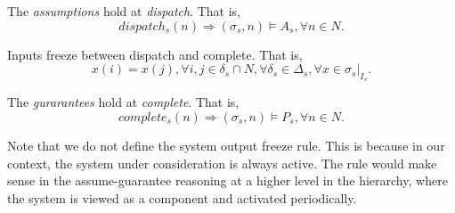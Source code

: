 The \emph{assumptions} hold at \emph{dispatch}. That is,
\begin{equation} 
\label{eqn:assumption}
	dispatch_s(n) \Rightarrow (\sigma_s, n) \models A_s, \forall n\in N.
\end{equation}

Inputs freeze between dispatch and complete. That is,
\begin{equation} 
\label{eqn:inputfreeze}
	x(i) = x(j), \forall i,j\in \delta_s \cap N, \forall \delta_s \in \Delta_s, \forall x \in \sigma_s|_{I_s}.
\end{equation}

The \emph{gurarantees} hold at \emph{complete}. That is,
\begin{equation} 
\label{eqn:guarantee}
	complete_s(n) \Rightarrow (\sigma_s, n) \models P_s, \forall n\in N.
\end{equation}

Note that we do not define the system output freeze rule. This is because in our context, the system under consideration is always active. The rule would make sense in the assume-guarantee reasoning at a higher level in the hierarchy, where the system is viewed as a component and activated periodically.
